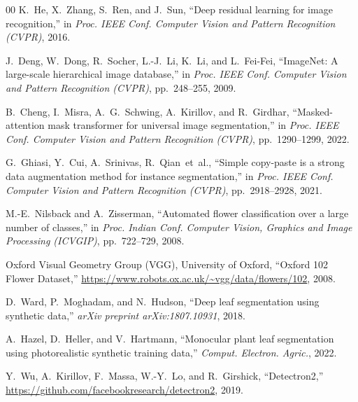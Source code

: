 \documentclass[conference]{IEEEtran}
\begin{document}
\begin{thebibliography}{00}
K.~He, X.~Zhang, S.~Ren, and J.~Sun,
``Deep residual learning for image recognition,''
in \textit{Proc. IEEE Conf. Computer Vision and Pattern Recognition (CVPR)}, 2016.

J.~Deng, W.~Dong, R.~Socher, L.-J.~Li, K.~Li, and L.~Fei-Fei,
``ImageNet: A large-scale hierarchical image database,''
in \textit{Proc. IEEE Conf. Computer Vision and Pattern Recognition (CVPR)},
pp.~248--255, 2009.

B.~Cheng, I.~Misra, A.~G.~Schwing, A.~Kirillov, and R.~Girdhar,
``Masked-attention mask transformer for universal image segmentation,''
in \textit{Proc. IEEE Conf. Computer Vision and Pattern Recognition (CVPR)},
pp.~1290--1299, 2022.

G.~Ghiasi, Y.~Cui, A.~Srinivas, R.~Qian~et~al.,
``Simple copy-paste is a strong data augmentation method for instance
segmentation,''
in \textit{Proc. IEEE Conf. Computer Vision and Pattern Recognition (CVPR)},
pp.~2918--2928, 2021.

M.-E.~Nilsback and A.~Zisserman,
``Automated flower classification over a large number of classes,''
in \textit{Proc. Indian Conf. Computer Vision, Graphics and Image Processing
(ICVGIP)}, pp.~722--729, 2008.

Oxford Visual Geometry Group (VGG), University of Oxford,
``Oxford 102 Flower Dataset,''
\url{https://www.robots.ox.ac.uk/~vgg/data/flowers/102}, 2008.

D.~Ward, P.~Moghadam, and N.~Hudson,
``Deep leaf segmentation using synthetic data,''
\textit{arXiv preprint arXiv:1807.10931}, 2018.

A.~Hazel, D.~Heller, and V.~Hartmann,
``Monocular plant leaf segmentation using photorealistic synthetic training
data,''
\textit{Comput. Electron. Agric.}, 2022.

Y.~Wu, A.~Kirillov, F.~Massa, W.-Y.~Lo, and R.~Girshick,
``Detectron2,''
\url{https://github.com/facebookresearch/detectron2}, 2019.

\end{thebibliography}
\end{document}
